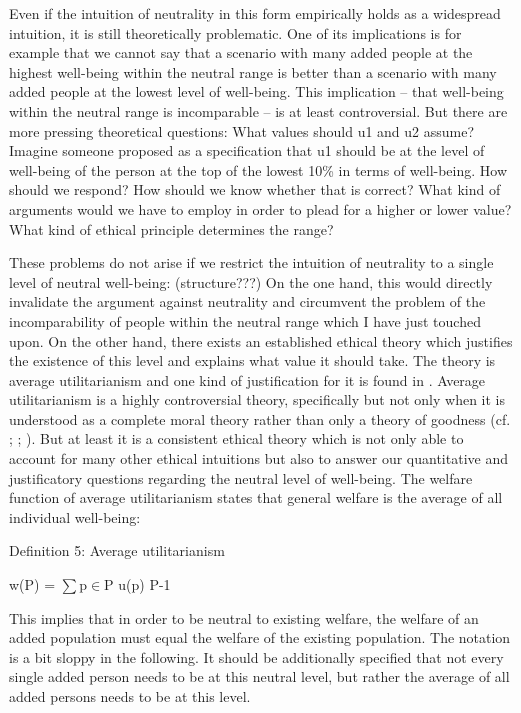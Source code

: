 Even if the intuition of neutrality in this form empirically holds as a widespread intuition, it is still theoretically problematic. One of its implications is for example that we cannot say that a scenario with many added people at the highest well-being within the neutral range is better than a scenario with many added people at the lowest level of well-being. This implication – that well-being within the neutral range is incomparable – is at least controversial. But there are more pressing theoretical questions: What values should u1 and u2 assume? Imagine someone proposed as a specification that u1 should be at the level of well-being of the person at the top of the lowest 10\% in terms of well-being. How should we respond? How should we know whether that is correct? What kind of arguments would we have to employ in order to plead for a higher or lower value? What kind of ethical principle determines the range? 

These problems do not arise if we restrict the intuition of neutrality to a single level of neutral well-being: (structure???) On the one hand, this would directly invalidate the argument against neutrality and circumvent the problem of the incomparability of people within the neutral range which I have just touched upon. On the other hand, there exists an established ethical theory which justifies the existence of this level and explains what value it should take. The theory is average utilitarianism and one kind of justification for it is found in \cite{harsanyi_1955}. Average utilitarianism is a highly controversial theory, specifically but not only when it is understood as a complete moral theory rather than only a theory of goodness (cf. ; ; ). But at least it is a consistent ethical theory which is not only able to account for many other ethical intuitions but also to answer our quantitative and justificatory questions regarding the neutral level of well-being. The welfare function of average utilitarianism states that general welfare is the average of all individual well-being: 

Definition 5: Average utilitarianism 

w(P) = ${\sum}$p${\in}$P u(p) {\textbullet} {\textbar}P{\textbar}{}-1 

This implies that in order to be neutral to existing welfare, the welfare of an added population must equal the welfare of the existing population. The notation is a bit sloppy in the following. It should be additionally specified that not every single added person needs to be at this neutral level, but rather the average of all added persons needs to be at this level.  

